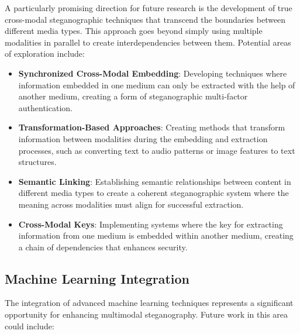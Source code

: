 \documentclass[12pt, a4paper, oneside]{book}
\begin{document}
A particularly promising direction for future research is the development of true cross-modal steganographic techniques that transcend the boundaries between different media types. This approach goes beyond simply using multiple modalities in parallel to create interdependencies between them. Potential areas of exploration include:

\begin{itemize}[leftmargin=*]
    \item \textbf{Synchronized Cross-Modal Embedding}: Developing techniques where information embedded in one medium can only be extracted with the help of another medium, creating a form of steganographic multi-factor authentication.

    \item \textbf{Transformation-Based Approaches}: Creating methods that transform information between modalities during the embedding and extraction processes, such as converting text to audio patterns or image features to text structures.

    \item \textbf{Semantic Linking}: Establishing semantic relationships between content in different media types to create a coherent steganographic system where the meaning across modalities must align for successful extraction.

    \item \textbf{Cross-Modal Keys}: Implementing systems where the key for extracting information from one medium is embedded within another medium, creating a chain of dependencies that enhances security.
\end{itemize}

\subsection{Machine Learning Integration}

The integration of advanced machine learning techniques represents a significant opportunity for enhancing multimodal steganography. Future work in this area could include:
\end{document}
